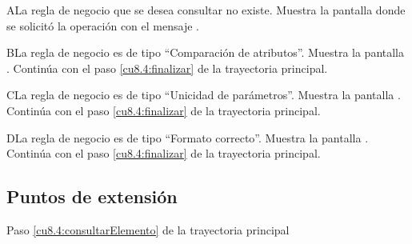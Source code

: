  \begin{UCtrayectoriaA}{A}{La regla de negocio que se desea consultar no existe.}
    \UCpaso[\UCsist] Muestra la pantalla donde se solicitó la operación con el mensaje .
 \end{UCtrayectoriaA} 
 \begin{UCtrayectoriaA}{B}{La regla de negocio es de tipo ``Comparación de atributos''.}
    \UCpaso[\UCsist] Muestra la pantalla .
    \UCpaso[] Continúa con el paso \ref{cu8.4:finalizar} de la trayectoria principal.
 \end{UCtrayectoriaA}
 \begin{UCtrayectoriaA}{C}{La regla de negocio es de tipo ``Unicidad de parámetros''.}
    \UCpaso[\UCsist] Muestra la pantalla .
    \UCpaso[] Continúa con el paso \ref{cu8.4:finalizar} de la trayectoria principal.
 \end{UCtrayectoriaA} 
 \begin{UCtrayectoriaA}{D}{La regla de negocio es de tipo ``Formato correcto''.}
    \UCpaso[\UCsist] Muestra la pantalla .
    \UCpaso[] Continúa con el paso \ref{cu8.4:finalizar} de la trayectoria principal.
 \end{UCtrayectoriaA} 
  
 \subsection{Puntos de extensión}
 
 	{Paso \ref{cu8.4:consultarElemento} de la trayectoria principal}
 	{}